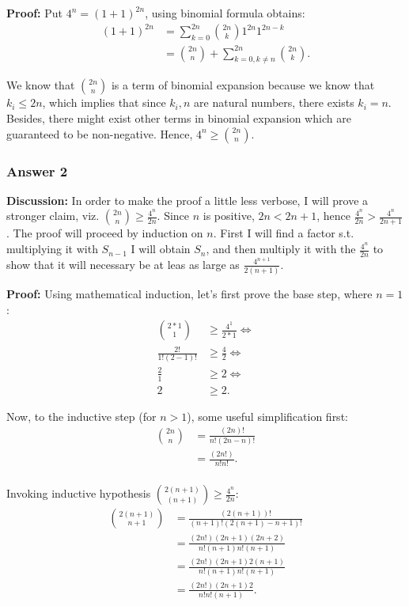 \documentclass[11pt]{article}
\begin{document}
\textbf{Proof:} Put $4^n=(1+1)^{2n}$, using binomial formula obtains:
\begin{align*}
  (1+1)^{2n} &= \sum_{k=0}^{2n} {2n \choose k}1^{2n}1^{2n-k} \\
            &= {2n \choose n} + \sum_{k=0, k\neq n}^{2n} {2n \choose k}.
\end{align*}

We know that ${2n \choose n}$ is a term of binomial expansion because we
know that $k_i \leq 2n$, which implies that since $k_i, n$ are natural numbers,
there exists $k_i = n$.  Besides, there might exist other terms in binomial
expansion which are guaranteed to be non-negative.  Hence,
$4^n \geq {2n \choose n}$.
\subsubsection{Answer 2}
\label{sec-1-1-2}
\textbf{Discussion:} In order to make the proof a little less verbose, I will prove
a stronger claim, viz. ${2n \choose n} \geq \frac{4^n}{2n}$.  Since $n$ is
positive, $2n < 2n +1$, hence $\frac{4^n}{2n} > \frac{4^n}{2n + 1}$.  The
proof will proceed by induction on $n$.  First I will find a factor s.t.
multiplying it with $S_{n-1}$ I will obtain $S_n$, and then multiply it
with the $\frac{4^n}{2n}$ to show that it will necessary be at leas as large
as $\frac{4^{n+1}}{2(n+1)}$.

\textbf{Proof:} Using mathematical induction, let's first prove the base step,
where $n=1$:
\begin{align*}
  { 2*1 \choose 1}    &\geq \frac{4^1}{2*1} \iff \\
  \frac{2!}{1!(2-1)!} &\geq \frac{4}{2} \iff \\
  \frac{2}{1}         &\geq 2 \iff \\
  2                   &\geq 2.
\end{align*}

Now, to the inductive step (for $n>1$), some useful simplification first:
\begin{equation}
  \begin{aligned}
    {2n \choose n} &= \frac{(2n)!}{n!(2n - n)!} \\
    &= \frac{(2n!)}{n!n!}. \\
  \end{aligned}
  \label{eq:base}
\end{equation}

Invoking inductive hypothesis ${2(n+1) \choose (n+1)} \geq \frac{4^n}{2n}$:
\begin{equation}
  \begin{aligned}
    {2(n+1) \choose n+1} &= \frac{(2(n+1))!}{(n+1)!(2(n+1) - n+1)!} \\
    &= \frac{(2n!)(2n+1)(2n+2)}{n!(n+1)n!(n+1)} \\
    &= \frac{(2n!)(2n+1)2(n+1)}{n!(n+1)n!(n+1)} \\
    &= \frac{(2n!)(2n+1)2}{n!n!(n+1)}.
  \end{aligned}
  \label{eq:step}
\end{equation}
\end{document}
